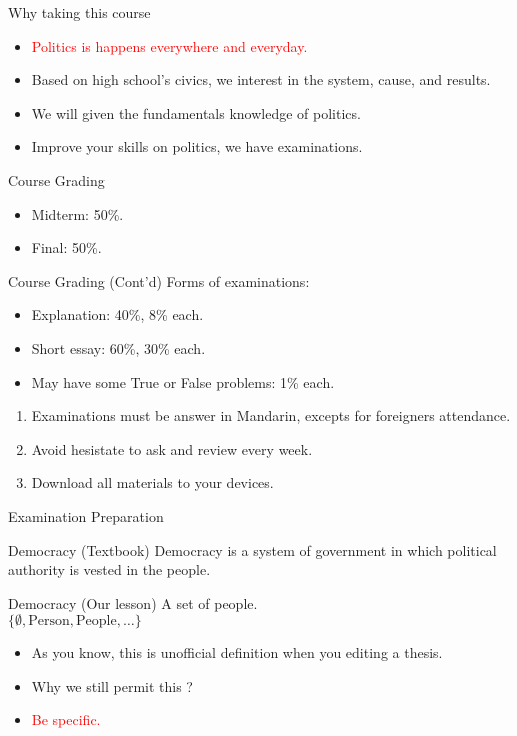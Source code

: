 \documentclass{beamer}
\begin{document}
\begin{frame}{Why taking this course}
\begin{itemize}
\pause
\item \textcolor{red}{Politics is happens everywhere and everyday.}
\pause
\item Based on high school's civics, we interest in the system, cause, and results.
\pause
\item We will given the fundamentals knowledge of politics.
\pause
\item Improve your skills on politics, we have examinations.
\end{itemize}
\end{frame}
\begin{frame}{Course Grading}
\begin{itemize}
\pause
\item Midterm: 50\%.
\vspace{1em}
\pause
\item Final: 50\%.
\end{itemize}
\end{frame}
\begin{frame}{Course Grading (Cont'd)}
\pause
Forms of examinations:
\pause
\begin{itemize}
    \item Explanation: 40\%, 8\% each.
    \pause
    \item Short essay: 60\%, 30\% each.
    \pause
    \item May have some True or False problems: 1\% each.
\end{itemize}
\pause
\begin{enumerate}
\item Examinations must be answer in Mandarin, excepts for foreigners attendance.
\pause
\item Avoid hesistate to ask and review every week.
\pause
\item Download all materials to your devices.
\end{enumerate}
\end{frame}
\begin{frame}{Examination Preparation}
\begin{block}{Democracy (Textbook)}
Democracy is a system of government in which political authority is vested in the people. \\
\end{block}
\begin{block}{Democracy (Our lesson)}
A set of people. \\
$\{ \emptyset, \text{Person}, \text{People}, \ldots \}$ \\
\end{block}
\begin{itemize}
\item As you know, this is unofficial definition when you editing a thesis. \\
\item Why we still permit this ? \\
\item \textcolor{red}{Be specific.} \\
\end{itemize}
\end{frame}
\end{document}
